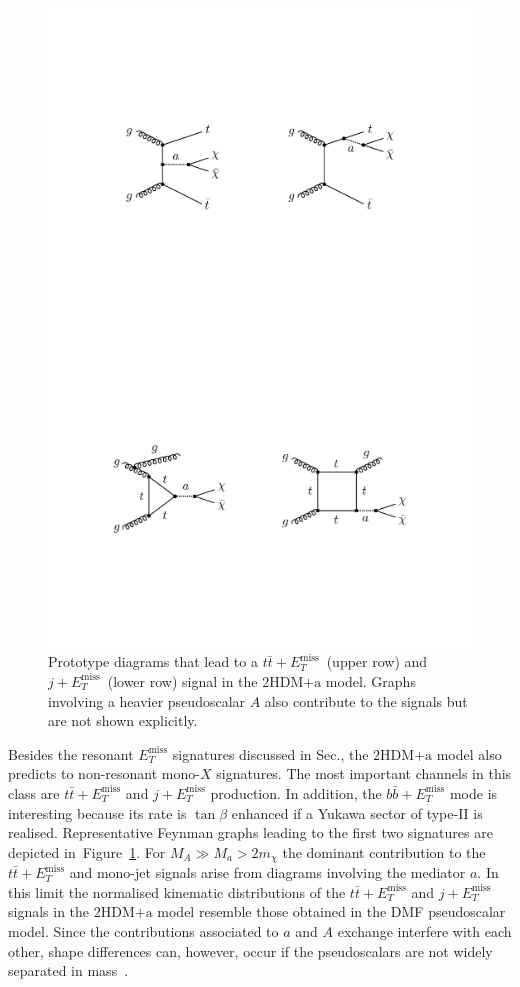 \documentclass[a4paper, 11pt,notoc]{article}
\newcommand{\MET}{\ensuremath{E_T^\mathrm{miss}}\xspace}
\newcommand{\hdma}{\ensuremath{\textrm{2HDM+a}}\xspace}
\begin{document}
\begin{figure}[t!]
\centering
\includegraphics[width=.725\textwidth]{ttmet.pdf}

\vspace{7mm}

\includegraphics[width=.8\textwidth]{jmet.pdf}

\vspace{4mm}
\caption{\label{fig:nonresonant} Prototype diagrams that lead  to a $t \bar t+\MET$~(upper row) and $j+\MET$~(lower row) signal in the \hdma model. Graphs involving a heavier pseudoscalar $A$ also contribute to the signals but are not shown explicitly.}
\end{figure}

Besides the resonant $\MET$ signatures discussed in Sec.\label{sec:experimentbasics}, the   \hdma model also predicts to non-resonant mono-$X$ signatures. The most important channels in this class are $t \bar t +\MET$ and $j+\MET$ production. In addition, the $b \bar b +\MET$ mode is interesting because its rate is $\tan \beta$ enhanced if a Yukawa sector of  type-II is realised.  Representative Feynman graphs leading to the first two signatures are depicted in~Figure~\ref{fig:nonresonant}. For $M_A \gg M_a > 2 m_\chi$ the dominant contribution to the  $t \bar t +\MET$ and mono-jet signals arise from diagrams involving the  mediator $a$. In this limit the normalised kinematic distributions of the $t \bar t + \MET$ and $j+\MET$ signals in the \hdma model resemble those obtained in the DMF pseudoscalar   model. Since the contributions  associated to $a$ and $A$ exchange interfere with each other, shape differences can, however, occur if the pseudoscalars are not widely separated in mass~\cite{Bauer:2017ota}.
\end{document}
